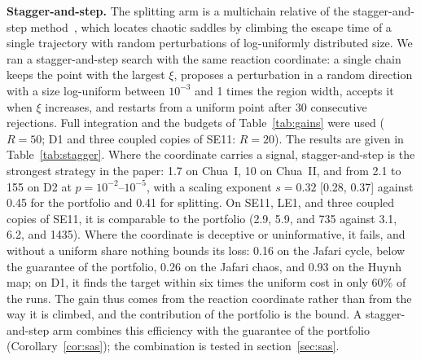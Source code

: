 \textbf{Stagger-and-step.} The splitting arm is a multichain relative of the stagger-and-step method~\cite{SweetNusseYorke2001}, which locates chaotic saddles by climbing the escape time of a single trajectory with random perturbations of log-uniformly distributed size. We ran a stagger-and-step search with the same reaction coordinate: a single chain keeps the point with the largest $\xi$, proposes a perturbation in a random direction with a size log-uniform between $10^{-3}$ and 1 times the region width, accepts it when $\xi$ increases, and restarts from a uniform point after 30 consecutive rejections. Full integration and the budgets of Table~\ref{tab:gains} were used ($R=50$; D1 and three coupled copies of SE11: $R=20$). The results are given in Table~\ref{tab:stagger}. Where the coordinate carries a signal, stagger-and-step is the strongest strategy in the paper: 1.7 on Chua~I, 10 on Chua~II, and from 2.1 to 155 on D2 at $p=10^{-2}$--$10^{-5}$, with a scaling exponent $s=0.32$ [0.28, 0.37] against 0.45 for the portfolio and 0.41 for splitting. On SE11, LE1, and three coupled copies of SE11, it is comparable to the portfolio (2.9, 5.9, and 735 against 3.1, 6.2, and 1435). Where the coordinate is deceptive or uninformative, it fails, and without a uniform share nothing bounds its loss: 0.16 on the Jafari cycle, below the guarantee of the portfolio, 0.26 on the Jafari chaos, and 0.93 on the Huynh map; on D1, it finds the target within six times the uniform cost in only 60\% of the runs. The gain thus comes from the reaction coordinate rather than from the way it is climbed, and the contribution of the portfolio is the bound. A stagger-and-step arm combines this efficiency with the guarantee of the portfolio (Corollary~\ref{cor:sas}); the combination is tested in section~\ref{sec:sas}.

